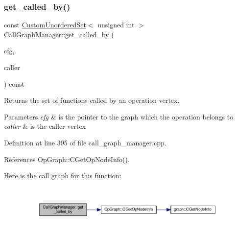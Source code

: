 \subsubsection{\texorpdfstring{get\+\_\+called\+\_\+by()}{get\_called\_by()}\hspace{0.1cm}{\footnotesize\ttfamily [2/2]}}
{\footnotesize\ttfamily const \hyperlink{classCustomUnorderedSet}{Custom\+Unordered\+Set}$<$ unsigned int $>$ Call\+Graph\+Manager\+::get\+\_\+called\+\_\+by (\begin{DoxyParamCaption}\item[{const \hyperlink{op__graph_8hpp_a9a0b240622c47584bee6951a6f5de746}{Op\+Graph\+Const\+Ref}}]{cfg,  }\item[{const \hyperlink{graph_8hpp_abefdcf0544e601805af44eca032cca14}{vertex} \&}]{caller }\end{DoxyParamCaption}) const}



Returns the set of functions called by an operation vertex. 


\begin{DoxyParams}{Parameters}
{\em cfg} & is the pointer to the graph which the operation belongs to \\
\hline
{\em caller} & is the caller vertex \\
\hline
\end{DoxyParams}


Definition at line 395 of file call\+\_\+graph\+\_\+manager.\+cpp.



References Op\+Graph\+::\+C\+Get\+Op\+Node\+Info().

Here is the call graph for this function\+:
\nopagebreak
\begin{figure}[H]
\begin{center}
\leavevmode
\includegraphics[width=350pt]{d5/d96/classCallGraphManager_af47e8c559960a5351867e97c30b33c66_cgraph}
\end{center}
\end{figure}
\mbox{\label{classCallGraphManager_a3416f718a1d4e6232d900bc1bb08ae0e}} 
